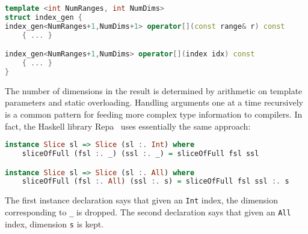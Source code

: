 \begin{singlespace}
\begin{lstlisting}[language=c++,style=ttcode]
template <int NumRanges, int NumDims>
struct index_gen {
index_gen<NumRanges+1,NumDims+1> operator[](const range& r) const
    { ... }

index_gen<NumRanges+1,NumDims> operator[](index idx) const
    { ... }
}
\end{lstlisting}
\end{singlespace}

\noindent
The number of dimensions in the result is determined by arithmetic
on template parameters and static overloading.
Handling arguments one at a time recursively is a common pattern
for feeding more complex type information to compilers.
In fact, the Haskell library Repa~\cite{Keller:2010rs} uses
essentially the same approach:

\begin{singlespace}
\begin{lstlisting}[language=haskell,style=ttcode]
instance Slice sl => Slice (sl :. Int) where
    sliceOfFull (fsl :. _) (ssl :. _) = sliceOfFull fsl ssl

instance Slice sl => Slice (sl :. All) where
    sliceOfFull (fsl :. All) (ssl :. s) = sliceOfFull fsl ssl :. s
\end{lstlisting}
\end{singlespace}

\noindent
The first instance declaration says that given an \texttt{Int} index,
the dimension corresponding to \texttt{\_} is dropped.
The second declaration says that given an \texttt{All} index,
dimension \texttt{s} is kept.

\iffalse
Our goal here is a bit unusual: we are not concerned with which rules
might work best, but merely with how they can be specified, so that
domain experts can experiment.
In fact different domains want different things.
Working with images, each dimension might be quite different, e.g. representing
time, space, or color, so you don't want to drop or rearrange dimensions very often.
\fi


